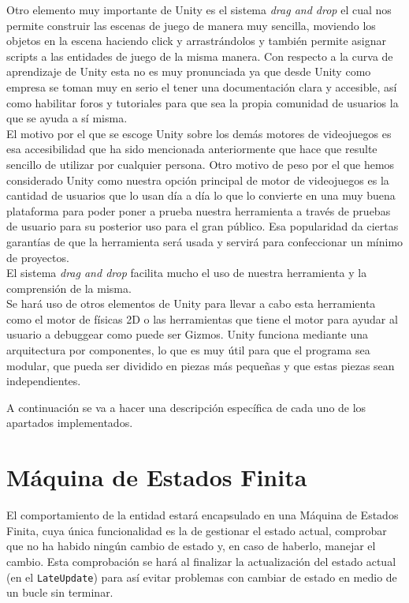 Otro elemento muy importante de Unity es el sistema \textit{drag and drop} el cual nos permite construir las escenas de juego de manera muy sencilla, moviendo los objetos en la escena haciendo click y arrastrándolos y también permite asignar scripts a las entidades de juego de la misma manera. Con respecto a la curva de aprendizaje de Unity esta no es muy pronunciada ya que desde Unity como empresa se toman muy en serio el tener una documentación clara y accesible, así como habilitar foros y tutoriales para que sea la propia comunidad de usuarios la que se ayuda a sí misma.\\

El motivo por el que se escoge Unity sobre los demás motores de videojuegos es esa accesibilidad que ha sido mencionada anteriormente que hace que resulte sencillo de utilizar por cualquier persona. Otro motivo de peso por el que hemos considerado Unity como nuestra opción principal de motor de videojuegos es la cantidad de usuarios que lo usan día a día lo que lo convierte en una muy buena plataforma para poder poner a prueba nuestra herramienta a través de pruebas de usuario para su posterior uso para el gran público. Esa popularidad da ciertas garantías de que la herramienta será usada y servirá para confeccionar un mínimo de proyectos.\\
El sistema \textit{drag and drop} facilita mucho el uso de nuestra herramienta y la comprensión de la misma.\\
Se hará uso de otros elementos de Unity para llevar a cabo esta herramienta como el motor de físicas 2D o las herramientas que tiene el motor para ayudar al usuario a debuggear como puede ser Gizmos.
Unity funciona mediante una arquitectura por componentes, lo que es muy útil para que el programa sea modular, que pueda ser dividido en piezas más pequeñas y que estas piezas sean independientes.\\

A continuación se va a hacer una descripción específica de cada uno de los apartados implementados.
\section {Máquina de Estados Finita}

El comportamiento de la entidad estará encapsulado en una Máquina de Estados Finita, cuya única funcionalidad es la de gestionar el estado actual, comprobar que no ha habido ningún cambio de estado y, en caso de haberlo, manejar el cambio. Esta comprobación se hará al finalizar la actualización del estado actual (en el \texttt{LateUpdate}) para así evitar problemas con cambiar de estado en medio de un bucle sin terminar.\\

